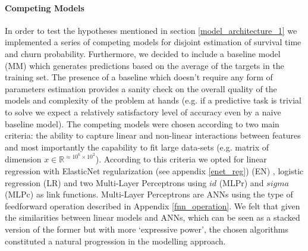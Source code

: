 \paragraph*{Competing Models}
\label{competing_models_1}
In order to test the hypotheses mentioned in section \ref{model_architecture_1} we implemented a series of competing models for disjoint estimation of survival time and churn probability. Furthermore, we decided to include a baseline model (MM) which generates predictions based on the average of the targets in the training set. The presence of a baseline which doesn't require any form of parameters estimation provides a sanity check on the overall quality of the models and complexity of the problem at hands (e.g. if a  predictive task is trivial to solve we expect a relatively satisfactory level of accuracy even by a naive baseline model). The competing models were chosen according to two main criteria: the ability to capture linear and non-linear interactions between features and most importantly the capability to fit large data-sets (e.g. matrix of dimension $x \in \mathbb{R}^{\approx10^6\times10^2}$). According to this criteria we opted for linear regression with ElasticNet regularization (see appendix \ref{enet_reg}) (EN) \cite{zou2005regularization}, logistic regression (LR) and two Multi-Layer Perceptrons using  $id$ (MLPr) and $sigma$ (MLPc) as link functions. Multi-Layer Perceptrons are ANNs using the type of feedforward operation described in Appendix \ref{fnn_operation}. We felt that given the similarities between linear models and ANNs, which can be seen as a stacked version of the former but with more `expressive power', the chosen algorithms constituted a natural progression in the modelling approach. 

